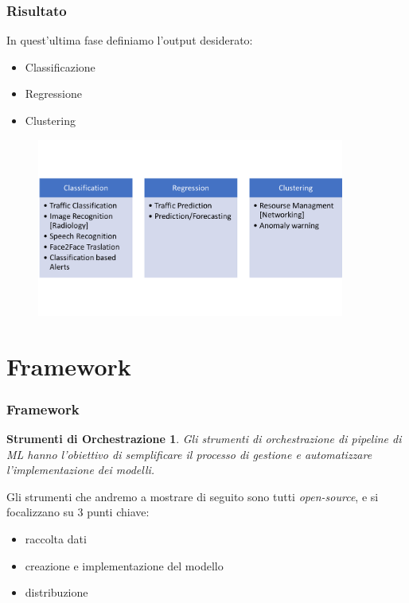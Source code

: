 \documentclass[xcolor=dvipsnames]{beamer}
\begin{document}
\begin{frame}
    \frametitle{Risultato}
    In quest'ultima fase definiamo l'output desiderato:
    \begin{itemize}
        \item Classificazione
        \item Regressione 
        \item Clustering
    \end{itemize}
    \begin{figure}
        \includegraphics[width=0.9\textwidth , height=0.7\textheight]{categoryML.png}
    \end{figure}
\end{frame}
\section{Framework}

\begin{frame}    
        \frametitle{Framework}
        \newtheorem{fw}{Strumenti di Orchestrazione}
        \begin{fw}
            Gli strumenti di orchestrazione di pipeline di ML hanno l'obiettivo di semplificare il processo di gestione e automatizzare l'implementazione dei modelli.
        \end{fw}
        Gli strumenti che andremo a mostrare di seguito sono tutti \textit{open-source}, e si focalizzano su 3 punti chiave:
        \begin{itemize}
            \item raccolta dati
            \item creazione e implementazione del modello
            \item distribuzione%
        \end{itemize}
\end{frame}
\end{document}
